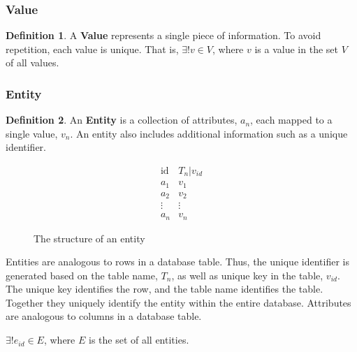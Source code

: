 \documentclass[12pt,letterpaper,oneside,notitlepage]{report}
\theoremstyle{definition}
\newtheorem{defn}{Definition}
\begin{document}
				\subsubsection{Value}
					\begin{defn}
						A \textbf{Value} represents a single piece of information.  To avoid repetition, each value is unique.  That is, $\exists! v \in V$, where $v$ is a value in the set $V$ of all values.
					\end{defn}

				\subsubsection{Entity}
					\begin{defn}
						An \textbf{Entity} is a collection of attributes, $a_n$, each mapped to a single value, $v_n$.  An entity also includes additional information such as a unique identifier.

						\begin{figure}[!ht]
							\centering
							\[
								\begin{array}{ll}
									\mathrm{id} & T_n|v_{id} \\
									a_1 & v_1 \\
									a_2 & v_2 \\
									\vdots & \vdots \\
									a_n & v_n
								\end{array}
							\]
							\caption{The structure of an entity}
							\label{fig:entity-rep}
						\end{figure}

						Entities are analogous to rows in a database table.  Thus, the unique identifier is generated based on the table name, $T_n$, as well as unique key in the table, $v_{id}$.  The unique key identifies the row, and the table name identifies the table.  Together they uniquely identify the entity within the entire database.  Attributes are analogous to columns in a database table.

						$\exists! e_{id} \in E$, where $E$ is the set of all entities.
					\end{defn}
\end{document}
